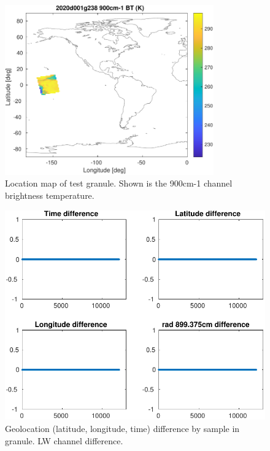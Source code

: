 \documentclass[11pt]{article}
\begin{document}
\begin{figure}[htbp]
\centering
\includegraphics[angle=0,width=9cm]{./figs/2020d001g238_900cm_bt_map_snpp.pdf}
\caption{\label{fig:org1ad1365}
Location map of test granule. Shown is the 900cm-1 channel brightness temperature.}
\end{figure}

\begin{figure}[htbp]
\centering
\includegraphics[width=.9\linewidth]{./figs/2020d001g238_geo_diff_snpp.pdf}
\caption{\label{fig:org6431cfd}
Geolocation (latitude, longitude, time) difference by sample in granule. LW channel difference.}
\end{figure}
\end{document}
